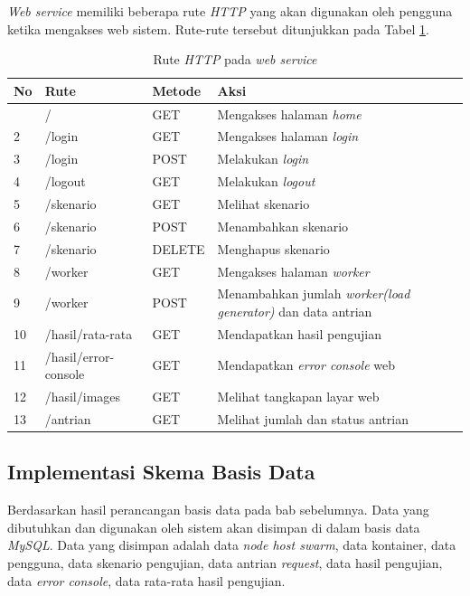 			\indent \textit{Web service} memiliki beberapa rute \textit{HTTP} yang akan digunakan oleh pengguna ketika mengakses web sistem. Rute-rute tersebut ditunjukkan pada Tabel \ref{tabelruteweb}.
			\begin{longtable}{|p{}|p{}|p{0.30\textwidth}|p{}|}
				\caption{Rute \textit{HTTP} pada \textit{web service}} \label{tabelruteweb} \\ \hline
				\textbf{No} & \textbf{Rute} & \textbf{Metode} & \textbf{Aksi} \\ \hline
				\endhead
				\endfoot
				\endlastfoot
				1 & / & GET & Mengakses halaman \textit{home} \\ \hline
				2 & /login & GET & Mengakses halaman \textit{login} \\ \hline
				3 & /login & POST & Melakukan \textit{login} \\ \hline
				4 & /logout & GET & Melakukan \textit{logout} \\ \hline
				5 & /skenario & GET & Melihat skenario \\ \hline
				6 & /skenario & POST & Menambahkan skenario \\ \hline
				7 & /skenario & DELETE & Menghapus skenario \\ \hline
				8 & /worker & GET & Mengakses halaman \textit{worker} \\ \hline
				9 & /worker & POST & Menambahkan jumlah \textit{worker(load generator)} dan data antrian \\ \hline
				10 & /hasil/rata-rata & GET & Mendapatkan hasil pengujian \\ \hline
				11 & /hasil/error-console & GET & Mendapatkan \textit{error console} web \\ \hline
				12 & /hasil/images & GET & Melihat tangkapan layar web \\ \hline
				13 & /antrian & GET & Melihat jumlah dan status antrian \\ \hline
				
			\end{longtable}
		
		\subsection{Implementasi Skema Basis Data}
			Berdasarkan hasil perancangan basis data pada bab sebelumnya. Data yang dibutuhkan dan digunakan oleh sistem akan disimpan di dalam basis data \textit{MySQL}. Data yang disimpan adalah data \textit{node host swarm}, data kontainer, data pengguna, data skenario pengujian, data antrian \textit{request}, data hasil pengujian, data \textit{error console}, data rata-rata hasil pengujian.
			
